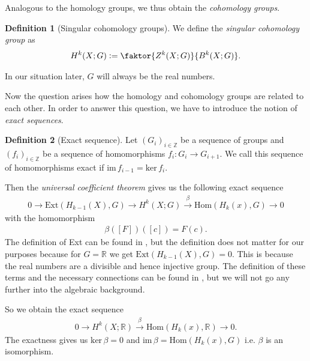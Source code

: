 \documentclass[12pt,a4paper]{article}
\theoremstyle{definition}
\newtheorem{definition}{Definition}
\newcommand{\integers}{\mathbb{Z}}
\newcommand{\real}{\mathbb{R}}
\begin{document}
Analogous to the homology groups, we thus obtain the \textit{cohomology groups}.
\begin{definition}[Singular cohomology groups]
    We define the \textit{singular cohomology group}
    as
    \begin{align*}
        H^k(X;G) \vcentcolon= \faktor{Z^k(X;G)}{B^k(X;G)}.
    \end{align*}
\end{definition}
\noindent In our situation later, $G$ will always be the real numbers.


Now the question arises how the homology and cohomology groups are related to
each other. In order to answer this question, we have to introduce
the notion of \textit{exact sequences}.

\begin{definition}[Exact sequence]
    Let $(G_i)_{i\in \integers}$ be a sequence of groups and 
    $(f_i)_{i\in\integers}$ be a sequence of homomorphisms
    $f_i: G_i \rightarrow G_{i+1}$. We call this sequence of homomorphisms
    exact if $\text{im}\,f_{i-1} = \text{ker}\,f_i$.
\end{definition}
Then the \textit{universal coefficient theorem} gives us the following 
exact sequence
\begin{align*}
    0 \rightarrow \text{Ext}(H_{k-1}(X),G) \rightarrow 
    H^k(X;G) \xrightarrow{\beta} \text{Hom}(H_k(x),G) \rightarrow 0
\end{align*}
with the homomorphism
\begin{align*}
    \beta([F])([c]) = F(c).
\end{align*}
The definition of Ext can be found in \cite[Sec.\,V.6]{topology_and_geometry}, 
but the definition does not matter for our purposes because for $G = \real$ 
we get
$\text{Ext}(H_{k-1}(X),G) = 0$. This is because the real numbers are 
a divisible and hence injective group. The definition of these terms and 
the necessary connections can be found in \cite[V.6]{topology_and_geometry}, 
but we will not go any further into the algebraic background.


So we obtain the exact sequence
\begin{align*}
    0 \rightarrow H^k(X;\real) \xrightarrow{\beta} 
    \text{Hom}(H_k(x),\real) \rightarrow 0.
\end{align*}
The exactness gives us $\text{ker}\,\beta = 0$ and 
$\text{im}\,\beta = \text{Hom}(H_k(x),G)$ i.e. $\beta$ is an isomorphism.
\end{document}
